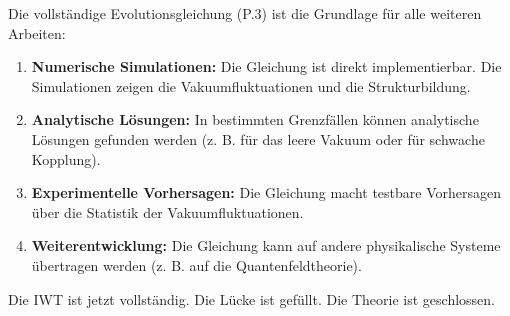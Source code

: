 Die vollständige Evolutionsgleichung (P.3) ist die Grundlage für alle weiteren Arbeiten:

\begin{enumerate}
    \item \textbf{Numerische Simulationen:} Die Gleichung ist direkt implementierbar. Die Simulationen zeigen die Vakuumfluktuationen und die Strukturbildung.
    \item \textbf{Analytische Lösungen:} In bestimmten Grenzfällen können analytische Lösungen gefunden werden (z. B. für das leere Vakuum oder für schwache Kopplung).
    \item \textbf{Experimentelle Vorhersagen:} Die Gleichung macht testbare Vorhersagen über die Statistik der Vakuumfluktuationen.
    \item \textbf{Weiterentwicklung:} Die Gleichung kann auf andere physikalische Systeme übertragen werden (z. B. auf die Quantenfeldtheorie).
\end{enumerate}

Die IWT ist jetzt vollständig. Die Lücke ist gefüllt. Die Theorie ist geschlossen.
